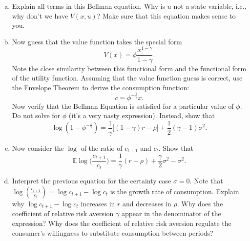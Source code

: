 \documentclass[11pt]{extarticle}
\theoremstyle{plain}
\theoremstyle{definition}
\begin{document}
\begin{enumerate}[(a)]
\item Explain all terms in this Bellman equation. Why is $u$ not a state variable, i.e., why don't we have $V(x, u)$? Make sure that this equation makes sense to you.


\item Now guess that the value function takes the special form
\begin{equation*}
	V(x) = \phi \frac{x^{1-\gamma}}{1-\gamma} .
\end{equation*}
Note the close similarity between this functional form and the functional form of the utility function. Assuming that the value function guess is correct, use the Envelope Theorem to derive the consumption function:
\begin{equation*}
c=\phi^{-\frac{1}{\gamma}} x .
\end{equation*}
Now verify that the Bellman Equation is satisfied for a particular value of $\phi$. Do not solve for $\phi$ (it's a very nasty expression). Instead, show that
\begin{equation*}
	\log (1 - \phi^{-\frac{1}{\gamma}}) = \frac{1}{\gamma} \Big[ (1-\gamma) r - \rho \Big] + \frac{1}{2}(\gamma-1) \sigma^2.
\end{equation*}


\item Now consider the $\log$ of the ratio of $c_{t+1}$ and $c_t$. Show that
\begin{equation*}
	\mathbb E \log \bigg(\frac{c_{t+1}}{c_t}\bigg) = \frac{1}{\gamma}(r-\rho) + \frac{\gamma}{2} \sigma^2 - \sigma^2.
\end{equation*}


\item Interpret the previous equation for the certainty case $\sigma = 0$. Note that $\log (\frac{c_{t+1}}{c_t}) = \log c_{t+1} - \log c_t$ is the growth rate of consumption. Explain why $\log c_{t+1} - \log c_t$ increases in $r$ and decreases in $\rho$. Why does the coefficient of relative risk aversion $\gamma$ appear in the denominator of the expression? Why does the coefficient of relative risk aversion regulate the consumer's willingness to substitute consumption between periods?

\end{enumerate}
\end{document}
